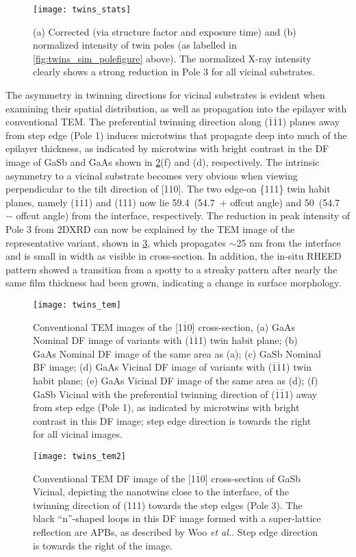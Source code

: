 \begin{figure}
    \centering
    \texttt{[image: twins\_stats]}
    \caption[Integrated x-ray intensities from pole figures]{\label{fig:twins_stats}(a) Corrected (via structure factor and exposure time) and (b) normalized intensity of twin poles (as labelled in \cref{fig:twins_sim_polefigure} above). The normalized X-ray intensity clearly shows a strong reduction in Pole 3 for all vicinal substrates.}
\end{figure}
The asymmetry in twinning directions for vicinal substrates is evident when examining their spatial distribution, as well as propagation into the epilayer with conventional TEM. The preferential twinning direction along ($\overline{1}\overline{1}$1) planes away from step edge (Pole 1) induces microtwins that propagate deep into much of the epilayer thickness, as indicated by microtwins with bright contrast in the DF image of GaSb and GaAs shown in \cref{fig:twins_tem}(f) and (d), respectively. The intrinsic asymmetry to a vicinal substrate becomes very obvious when viewing perpendicular to the tilt direction of [110]. The two edge-on \{111\} twin habit planes, namely ($\overline{1}\overline{1}$1) and (111) now lie 59.4\degree~(54.7\degree~$+$ offcut angle) and 50\degree~(54.7\degree~$-$ offcut angle) from the interface, respectively. The reduction in peak intensity of Pole 3 from 2DXRD can now be explained by the TEM image of the representative variant, shown in \cref{fig:twins_tem2}, which propagates $\sim$25 nm from the interface and is small in width as visible in cross-section. In addition, the in-situ RHEED pattern showed a transition from a spotty to a streaky pattern after nearly the same film thickness had been grown, indicating a change in surface morphology.
\begin{figure}
    \centering
    \texttt{[image: twins\_tem]}
    \caption[TEM images of III-V on silicon]{\label{fig:twins_tem}Conventional TEM images of the [1$\overline{1}$0] cross-section, (a) GaAs Nominal DF image of variants with ($\overline{1}\overline{1}$1) twin habit plane; (b) GaAs Nominal DF image of the same area as (a); (c) GaSb Nominal BF image; (d) GaAs Vicinal DF image of variants with ($\overline{1}\overline{1}$1) twin habit plane; (e) GaAs Vicinal DF image of the same area as (d); (f) GaSb Vicinal with the preferential twinning direction of ($\overline{1}\overline{1}$1) away from step edge (Pole 1), as indicated by microtwins with bright contrast in this DF image; step edge direction is towards the right for all vicinal images.}
\end{figure}
\begin{figure}
    \centering
    \texttt{[image: twins\_tem2]}
    \caption[TEM of GaSb on silicon]{\label{fig:twins_tem2}Conventional TEM DF image of the [1$\overline{1}$0] cross-section of GaSb Vicinal, depicting the nanotwins close to the interface, of the twinning direction of (111) towards the step edges (Pole 3). The black ``n''-shaped loops in this DF image formed with a super-lattice reflection are APBs, as described by Woo \textit{et al.}\cite{Woo}. Step edge direction is towards the right of the image.}
\end{figure}
